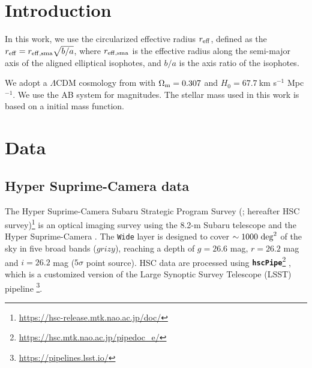 \documentclass[twocolumn,astrosymb,twocolappendix]{aastex631}
\newcommand{\code}[1]{\textbf{\texttt{#1}}}
\begin{document}
\begin{CJK*}{UTF8}{gbsn}

\begin{abstract}

\end{abstract}



\section{Introduction} \label{sec:intro}

In this work, we use the circularized effective radius $r_{\rm eff}$, defined as the $r_{\rm eff} = r_{\rm eff, sma} \sqrt{b/a}$, where $r_{\rm eff, sma}$ is the effective radius along the semi-major axis of the aligned elliptical isophotes, and $b/a$ is the axis ratio of the isophotes.

We adopt a $\Lambda$CDM cosmology from \citet{Planck15} with $\Omega_{\rm m}= 0.307$ and $H_0 = 67.7\ $km s$^{-1}$ Mpc$^{-1}$. We use the AB system \citep{Oke1983} for magnitudes. The stellar mass used in this work is based on a \citet{Chabrier2003} initial mass function.

\section{Data} \label{sec:data}
\subsection{Hyper Suprime-Camera data}
The Hyper Suprime-Camera Subaru Strategic Program Survey (\citealt{Aihara2018}; hereafter HSC survey)\footnote{\url{https://hsc-release.mtk.nao.ac.jp/doc/}} is an optical imaging survey using the 8.2-m Subaru telescope and the Hyper Suprime-Camera \citep{Miyazaki2012, Miyazaki2018}. The \texttt{Wide} layer is designed to cover $\sim 1000\ \rm{deg}^{2}$ of the sky in five broad bands ($grizy$), reaching a depth of $g=26.6$ mag, $r=26.2$ mag and $i=26.2$ mag ($5\sigma$ point source). HSC data are processed using \code{hscPipe}\footnote{\url{https://hsc.mtk.nao.ac.jp/pipedoc_e/}} \citep{Bosch2018}, which is a customized version of the Large Synoptic Survey Telescope (LSST) pipeline \citep{LSST-pipeline}\footnote{\url{https://pipelines.lsst.io/}}. 


\end{CJK*}
\end{document}
